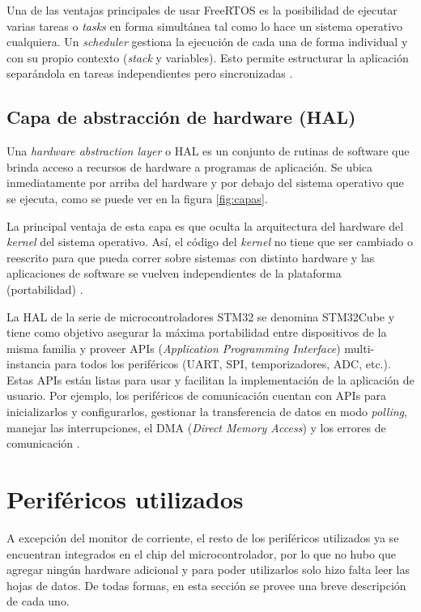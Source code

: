 Una de las ventajas principales de usar FreeRTOS es la posibilidad de ejecutar varias tareas o \textit{tasks} en forma simultánea tal como lo hace un sistema operativo cualquiera. Un \textit{scheduler} gestiona la ejecución de cada una de forma individual y con su propio contexto (\textit{stack} y variables). Esto permite estructurar la aplicación separándola en tareas independientes pero sincronizadas \citep{WEBSITE:FREERTOS}.

\subsection{Capa de abstracción de hardware (HAL)}

Una \textit{hardware abstraction layer} o HAL es un conjunto de rutinas de software que brinda acceso a recursos de hardware a programas de aplicación. Se ubica inmediatamente por arriba del hardware y por debajo del sistema operativo que se ejecuta, como se puede ver en la figura \ref{fig:capas}.

La principal ventaja de esta capa es que oculta la arquitectura del hardware del \textit{kernel} del sistema operativo. Así, el código del \textit{kernel} no tiene que ser cambiado o reescrito para que pueda correr sobre sistemas con distinto hardware y las aplicaciones de software se vuelven independientes de la plataforma (portabilidad) \citep{WEBSITE:HAL}.

La HAL de la serie de microcontroladores STM32 se denomina STM32Cube y tiene como objetivo asegurar la máxima portabilidad entre dispositivos de la misma familia y proveer APIs (\textit{Application Programming Interface}) multi-instancia para todos los periféricos (UART, SPI, temporizadores, ADC, etc.). Estas APIs están listas para usar y facilitan la implementación de la aplicación de usuario. Por ejemplo, los periféricos de comunicación cuentan con APIs para inicializarlos y configurarlos, gestionar la transferencia de datos en modo \textit{polling}, manejar las interrupciones, el DMA (\textit{Direct Memory Access}) y los errores de comunicación \citep{WEBSITE:STM32CUBE}.

\section{Periféricos utilizados}

A excepción del monitor de corriente, el resto de los periféricos utilizados ya se encuentran integrados en el chip del microcontrolador, por lo que no hubo que agregar ningún hardware adicional y para poder utilizarlos solo hizo falta leer las hojas de datos. De todas formas, en esta sección se provee una breve descripción de cada uno.

